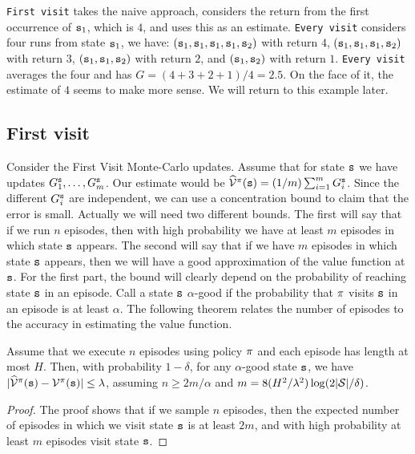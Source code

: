 {\tt First visit} takes the naive approach, considers the return from
the first occurrence of ${\tt s}_1$, which is $4$, and uses this as
an estimate. {\tt Every visit} considers four runs from state
${\tt s}_1$, we have:
$({\tt s}_1,{\tt s}_1,{\tt s}_1,{\tt s}_1,{\tt s}_2)$ with return $4$,
$({\tt s}_1,{\tt s}_1,{\tt s}_1,{\tt s}_2)$ with return $3$,
$({\tt s}_1,{\tt s}_1,{\tt s}_2)$ with return $2$, and
$({\tt s}_1,{\tt s}_2)$ with return $1$. {\tt Every visit} averages
the four and has $G=(4+3+2+1)/4=2.5$. On the face of it, the
estimate of $4$ seems to make more sense. 
We will return to this example later.
\begin{advanced}


\subsection{First visit}

Consider the First Visit Monte-Carlo updates. Assume that for state
${\tt s}$ we have updates $G_1^{\tt s}, \ldots , G^{\tt s}_m$. Our
estimate would be
$\widehat{\mathcal{V}}^\pi({\tt s})=(1/m)\sum_{i=1}^m G^{\tt s}_i$.
Since the different $G^{\tt s}_i$ are independent, we can use a
concentration bound to claim that the error is small. Actually we
will need two different bounds. The first will say that if we run
$n$ episodes, then with high probability we have at least $m$
episodes in which state ${\tt s}$ appears. The second will say that if
we have $m$ episodes in which state ${\tt s}$ appears, then we will
have a good approximation of the value function at ${\tt s}$. For the first part,
the bound will clearly depend on the probability of reaching state
${\tt s}$ in an episode. Call a state ${\tt s}$ $\alpha$-good if
the probability that $\pi$ visits ${\tt s}$ in an episode is at
least $\alpha$.
The following theorem relates the number of episodes to the accuracy
in estimating the value function.

\begin{theorem}
Assume that we execute $n$ episodes using policy $\pi$ and each
episode has length at most $H$. Then, with probability $1-\delta$,
for any $\alpha$-good state ${\tt s}$, we have
$|\widehat{\mathcal{V}}^\pi({\tt s})-\mathcal{V}^\pi({\tt s})|\leq
\lambda$, assuming $n\geq 2m/
\alpha$ and
$m=8(H^2/\lambda^2)\log(2|\mathcal{S}|/\delta)$.
\end{theorem}

\begin{proof}
The proof shows that if we sample $n$ episodes, then the expected number of episodes in which we visit state ${\tt s}$ is at least $2m$, and with high probability at least $m$ episodes visit state ${\tt s}$.


\end{proof}
\end{advanced}
